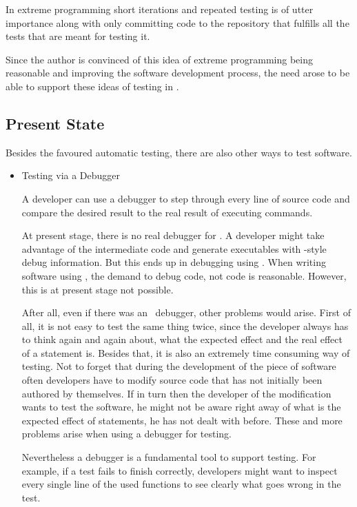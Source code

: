 In extreme programming short iterations and repeated testing is of utter importance along with only committing code to the repository that fulfills all the tests that are meant for testing it.

Since the author is convinced of this idea of extreme programming being reasonable and improving the software development process, the need arose to be able to support these ideas of testing in \Aldor\cite{Aldor}.

\subsection{Present State}

Besides the favoured automatic testing, there are also other ways to test software.

\begin{itemize}

\item{Testing via a Debugger}

A developer can use a debugger to step through every line of source code and compare the desired result to the real result of executing commands.

At present stage, there is no real debugger for \Aldor. A developer might take advantage of the intermediate \C code and generate executables with \C-style debug information. But this ends up in debugging using \C. When writing software using \Aldor, the demand to debug \Aldor code, not \C code is reasonable. However, this is at present stage not possible.

After all, even if there was an \Aldor~debugger, other problems would arise. First of all, it is not easy to test the same thing twice, since the developer always has to think again and again about, what the expected effect and the real effect of a statement is. Besides that, it is also an extremely time consuming way of testing. Not to forget that during the development of the piece of software often developers have to modify source code that has not initially been authored by themselves. If in turn then the developer of the modification wants to test the software, he might not be aware right away of what is the expected effect of statements, he has not dealt with before. These and more problems arise when using a debugger for testing.

Nevertheless a debugger is a fundamental tool to support testing. For example, if a test fails to finish correctly, developers might want to inspect every single line of the used functions to see clearly what goes wrong in the test.


\end{itemize}
